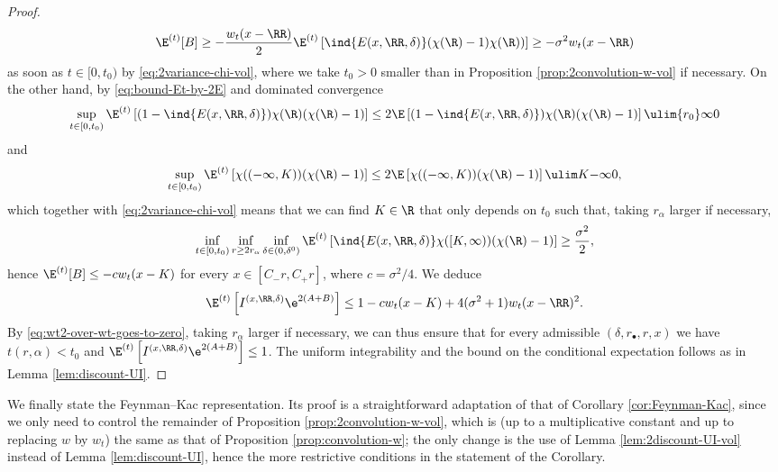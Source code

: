 \documentclass[10pt,a4paper]{article}
\begin{document}
\begin{proof}
\begin{equation*}
\E^{(t)}[B] \geq -\frac{w_t(x-\RR)}{2} \E^{(t)}\left[\ind{E(x,\RR,\delta)} (\chi(\R)-1)\chi(\R)) \right] \geq -\sigma^2 w_t(x-\RR)
\end{equation*}
as soon as $t\in [0,t_0)$ by \eqref{eq:2variance-chi-vol}, where we take $t_0>0$ smaller than in Proposition \ref{prop:2convolution-w-vol} if necessary. On the other hand, by \eqref{eq:bound-Et-by-2E} and dominated convergence
\begin{align*}
\sup_{t\in [0,t_0)} \E^{(t)}\left[(1-\ind{E(x,\RR,\delta)}) \chi(\R) (\chi(\R)-1) \right] \leq 2\E\left[(1-\ind{E(x,\RR,\delta)}) \chi(\R) (\chi(\R)-1) \right] \ulim {r_0} \infty 0 
\end{align*}
and 
\begin{align*}
\sup_{t\in [0,t_0)} \E^{(t)}\left[ \chi((-\infty, K)) (\chi(\R)-1) \right] \leq 2 \E\left[ \chi((-\infty, K)) (\chi(\R)-1) \right] \ulim K {-\infty} 0 ,
\end{align*}
which together with \eqref{eq:2variance-chi-vol} means that we can find $K\in\R$ that only depends on $t_0$ such that, taking $r_\alpha$ larger if necessary,
\begin{align*}
\inf_{t\in[0,t_0)} \inf_{r\geq 2r_\alpha} \inf_{\delta \in (0,\delta^0)} \E^{(t)}\left[ \ind{E(x,\RR,\delta)} \chi([K,\infty)) (\chi(\R)-1) \right] \geq \frac{\sigma^2}{2} ,
\end{align*}
hence $\E^{(t)}[B] \leq - c w_t(x-K)$ for every $x\in [C_-r, C_+r]$, where $c=\sigma^2/4$. We deduce 
\[ \E^{(t)}\left[ I^{(x,\RR,\delta)} \e^{2(A+B)} \right] \leq 1 - c w_t(x-K) + 4(\sigma^2+1) w_t(x-\RR)^2 . \]
By \eqref{eq:wt2-over-wt-goes-to-zero}, taking $r_\alpha$ larger if necessary, we can thus ensure that for every admissible $(\delta, r_\bullet, r, x)$ we have $t(r,\alpha)<t_0$ and $\E^{(t)}\left[ I^{(x,\RR,\delta)} \e^{2(A+B)} \right] \leq 1$. The uniform integrability and the bound on the conditional expectation follows as in Lemma \ref{lem:discount-UI}. 
\end{proof}




We finally state the Feynman--Kac representation. Its proof is a straightforward adaptation of that of Corollary \ref{cor:Feynman-Kac}, since we only need to control the remainder of Proposition \ref{prop:2convolution-w-vol}, which is (up to a multiplicative constant and up to replacing $w$ by $w_t$) the same as that of Proposition \ref{prop:convolution-w}; the only change is the use of Lemma \ref{lem:2discount-UI-vol} instead of Lemma \ref{lem:discount-UI}, hence the more restrictive conditions in the statement of the Corollary.  
\end{document}
